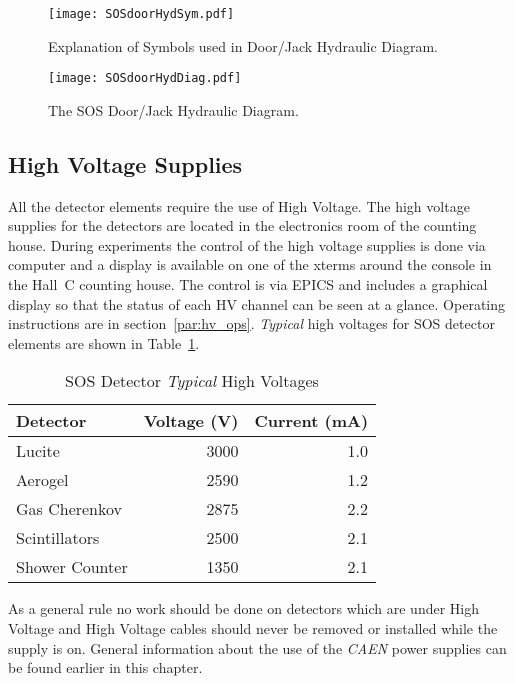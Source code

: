 \begin{obsolete}
\begin{figure}
\texttt{[image: SOSdoorHydSym.pdf]}
\caption{Explanation of Symbols used in Door/Jack Hydraulic 
Diagram. \label{fig:SOSdoorHydSym}}
\end{figure}
\clearpage

\begin{figure}
\texttt{[image: SOSdoorHydDiag.pdf]}
\caption{The SOS Door/Jack Hydraulic Diagram. \label{fig:SOSdoorHydDiag}}
\end{figure}
\clearpage


\subsection{High Voltage Supplies }

All the detector elements require the use of High Voltage. The
high voltage supplies for the detectors are located in the 
electronics room of the counting house.
During experiments the control of the high voltage supplies is done via
computer and a display is available on one of the xterms around
the console in the Hall~C counting house. The control is via
EPICS and includes a graphical display so that the status of each
HV channel can be seen at a glance. Operating instructions are
in section~\ref{par:hv_ops}. {\em Typical} high voltages for
SOS detector elements are shown in Table~\ref{tab:sos_hv}.

\begin{table}[!hbt]\centering
   \caption{SOS Detector {\em Typical} High Voltages\label{tab:sos_hv}}
   \begin{tabular}{lrr}
      Detector & Voltage (V) & Current (mA)\\
      \hline
      Lucite         & 3000  & 1.0 \\
      Aerogel        & 2590  & 1.2 \\
      Gas Cherenkov   & 2875  & 2.2 \\
      Scintillators  & 2500  & 2.1 \\
      Shower Counter & 1350  & 2.1 \\
      \hline
   \end{tabular}
\end{table}

As a general rule no work should be done on detectors which are under
High Voltage and
High Voltage cables should never be removed or installed while the supply is on.
General information about the use of the {\em CAEN} power supplies can be
found earlier in this chapter.



\end{obsolete}
